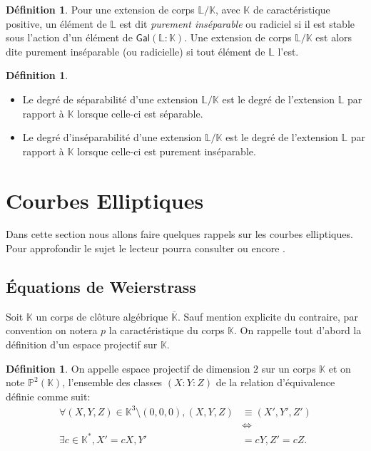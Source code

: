 \documentclass[10pt,a4paper]{book}
\theoremstyle{plain}
\theoremstyle{definition}
\theoremstyle{definition}
\theoremstyle{definition}
\theoremstyle{definition}
\theoremstyle{definition}
\newtheorem{defi}[thm]{Définition}
\theoremstyle{remark}
\theoremstyle{remark}
\theoremstyle{definition}
\begin{document}
\begin{defi}
Pour une extension de corps $\mathbb{L}/\mathbb{K}$, avec $\mathbb{K}$ de  
caractéristique positive, un élément de $\mathbb{L}$ est dit \emph{purement 
inséparable} ou radiciel si il est stable sous l'action d'un élément de 
$ \mathsf{Gal}(\mathbb{L}:\mathbb{K})$. Une extension de corps 
$\mathbb{L}/\mathbb{K}$ est alors dite purement inséparable (ou radicielle)
si tout élément de $\mathbb{L}$ l'est.
\end{defi}

\begin{defi}
\label{def:degs:degi}\quad 
\begin{itemize}
\item Le degré de séparabilité d'une extension $\mathbb{L}/\mathbb{K}$ est le degré
de l'extension $\mathbb{L}$ par rapport à $\mathbb{K}$ lorsque celle-ci est 
séparable.
\item Le degré d'inséparabilité d'une extension $\mathbb{L}/\mathbb{K}$ est le degré
de l'extension $\mathbb{L}$ par rapport à $\mathbb{K}$ lorsque celle-ci est 
purement inséparable.
\end{itemize}
\end{defi}



\section{Courbes Elliptiques}
Dans cette section nous allons faire quelques rappels sur les courbes 
elliptiques. Pour approfondir le sujet le lecteur pourra consulter 
\cite{Silv1} ou encore \cite{Washington2008}.

\subsection{\'Equations de Weierstrass}

Soit $\mathbb{K}$ un corps de clôture algébrique $\overline{\mathbb{K}}$. Sauf mention explicite du contraire, par convention on notera $p$ la caractéristique du corps $\mathbb{K}$. On rappelle tout d'abord  la définition d'un espace projectif sur $\mathbb{K}$.

\begin{defi}
On appelle espace projectif de dimension $2$ sur un corps $\mathbb{K}$ et on note $\mathbb{P}^2(\mathbb{K})$, l'ensemble des classes $(X:Y:Z)$ de la relation d'équivalence définie comme suit:
\begin{equation*}
\begin{alignedat}{1}
\forall (X,Y,Z) \in \mathbb{K}^3 \setminus (0,0,0), (X,Y,Z) &\equiv (X',Y',Z')\\ 
&\Leftrightarrow  \\
\exists c \in \mathbb{K}^*, X'=cX, Y' &=cY, Z'=cZ.
\end{alignedat}
\end{equation*}
\end{defi}
\end{document}

